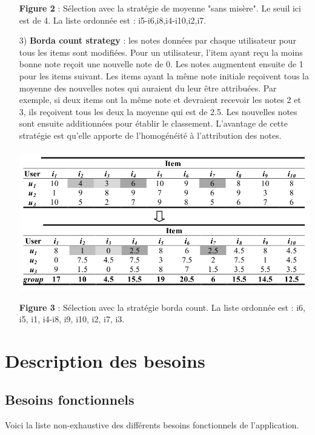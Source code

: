 \documentclass[12pt, openany]{report}
\begin{document}
\begin{itemize}
\textbf{Figure 2} : Sélection avec la stratégie de moyenne "sans misère". Le seuil ici est de 4. La liste ordonnée est : i5-i6,i8,i4-i10,i2,i7.
\\
\item[3)] \textbf{Borda count strategy} : les notes données par chaque utilisateur pour tous les items sont modifiées. Pour un utilisateur, l'item ayant reçu la moins bonne note reçoit une nouvelle note de 0. Les notes augmentent ensuite de 1 pour les items suivant. Les items ayant la même note initiale reçoivent tous la moyenne des nouvelles notes qui auraient du leur être attribuées. Par exemple, si deux items ont la même note et devraient recevoir les notes 2 et 3, ils reçoivent tous les deux la moyenne qui est de 2.5. Les nouvelles notes sont ensuite additionnées pour établir le classement. L'avantage de cette stratégie est qu'elle apporte de l'homogénéité à l'attribution des notes.
\\
\\
\includegraphics[scale=0.4]{images/_borda_count.png}

\textbf{Figure 3} : Sélection avec la stratégie borda count. La liste ordonnée est : i6, i5, i1, i4-i8, i9, i10, i2, i7, i3.
\end{itemize}

\newpage
\section{Description des besoins}

\subsection{Besoins fonctionnels}

Voici la liste non-exhaustive des différents besoins fonctionnels de l'application.
\end{document}
